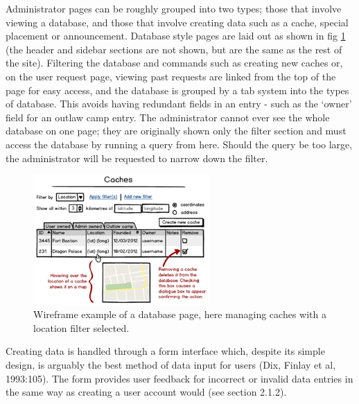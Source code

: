 Administrator pages can be roughly grouped into two types; those that involve viewing a database, and those that involve creating data such as a cache, special placement or announcement. Database style pages are laid out as shown in fig \ref{caches_wireframe} (the header and sidebar sections are not shown, but are the same as the rest of the site). Filtering the database and commands such as creating new caches or, on the user request page, viewing past requests are linked from the top of the page for easy access, and the database is grouped by a tab system into the types of database. This avoids having redundant fields in an entry - such as the `owner' field for an outlaw camp entry. The administrator cannot ever see the whole database on one page; they are originally shown only the filter section and must access the database by running a query from here. Should the query be too large, the administrator will be requested to narrow down the filter.

\begin{figure}[h!]
	\begin{center}
	\includegraphics[width=0.6\textwidth]{images/caches_wireframe}
	\caption{Wireframe example of a database page, here managing caches with a location filter selected.}
	\label{caches_wireframe}
	\end{center}
\end{figure}

Creating data is handled through a form interface which, despite its simple design, is arguably the best method of data input for users (Dix, Finlay et al, 1993:105). The form provides user feedback for incorrect or invalid data entries in the same way as creating a user account would (see section 2.1.2).
